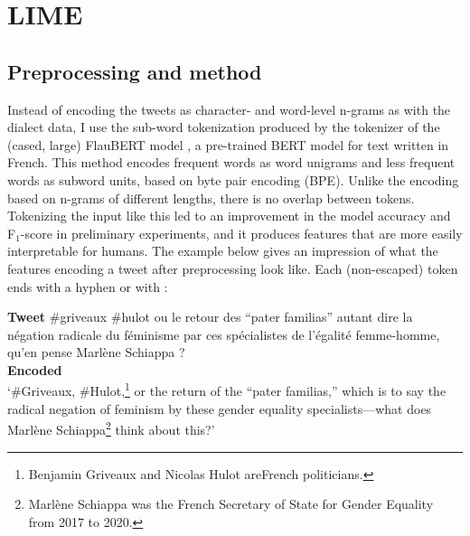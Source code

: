 
\section{LIME}
\label{sec:tweets-svm}

\subsection{Preprocessing and method}
\label{sec:tweets-svm-method}

Instead of encoding the tweets as character- and word-level n-grams as with the dialect data, I use the sub-word tokenization produced by the tokenizer of the (cased, large) FlauBERT model \citep{le2020flaubert}, a pre-trained BERT model for text written in French.
This method encodes frequent words as word unigrams and less frequent words as subword units, based on byte pair encoding (BPE).
Unlike the encoding based on n-grams of different lengths, there is no overlap between tokens.
Tokenizing the input like this led to an improvement in the model accuracy and F$_1$-score in preliminary experiments, and it produces features that are more easily interpretable for humans.
The example below gives an impression of what the features encoding a tweet after preprocessing look like.
Each (non-escaped) token ends with a hyphen or with \eow:

\begin{exe}
\ex 
\gll
\textbf{Tweet} \#griveaux \#hulot ou le retour des ``pater familias'' autant dire la négation radicale du féminisme par ces spécialistes de l'égalité femme-homme, qu'en pense Marlène Schiappa ?\\
\textbf{Encoded} \hashtag{} \hashtag{}     {  } {  }            { } { \ngram{-\eow}  \ngram{,\eow}} { }  { } { }  \\
\trans `\#Griveaux, \#Hulot,\footnote{%
Benjamin Griveaux and Nicolas Hulot areFrench politicians.}
or the return of the ``pater familias,'' which is to say the radical negation of feminism by these gender equality specialists---what does Marlène Schiappa\footnote{%
Marlène Schiappa was the French Secretary of State for Gender Equality from 2017 to 2020.}
think about this?'
\label{gloss:tweet-preprocessing}
\end{exe}

